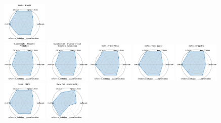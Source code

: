 \begin{figure}[ht!]
\includegraphics[width=0.1900\textwidth]{images/seafloorgenai_radar.pdf}
\\[1ex]
\includegraphics[width=0.1900\textwidth]{images/supercond_-_property_prediction_radar.pdf}
\includegraphics[width=0.1900\textwidth]{images/supercond_-__inverse_crystal_structure_generation_radar.pdf}
\includegraphics[width=0.1900\textwidth]{images/gess_-_track_pileup_radar.pdf}
\includegraphics[width=0.1900\textwidth]{images/gess_-_track_signal_radar.pdf}
\includegraphics[width=0.1900\textwidth]{images/gess_-_drugood_radar.pdf}
\\[1ex]
\includegraphics[width=0.1900\textwidth]{images/gess_-_qmof_radar.pdf}
\includegraphics[width=0.1900\textwidth]{images/vocal_call_locator_vcl_radar.pdf}

\end{figure}
